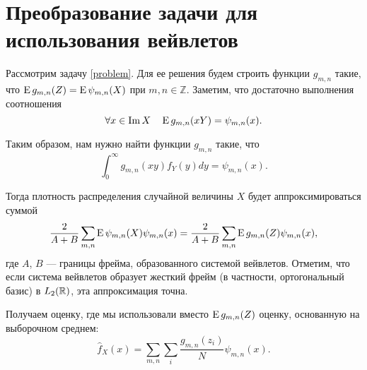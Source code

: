 \documentclass[../paper.tex]{subfiles}
\begin{document}
\section{Преобразование задачи для использования вейвлетов}
Рассмотрим задачу \ref{problem}. Для ее решения будем строить функции $g_{m,n}$ такие, что $\operatorname{E} g_{m,n}(Z) = \operatorname{E} \psi_{m,n}(X)$ при $m, n \in \mathbb{Z}$. Заметим, что достаточно выполнения соотношения
\[
    \forall x \in \operatorname{Im} X \quad \operatorname{E} g_{m,n} (xY) = \psi_{m,n}(x) 
.\]

Таким образом, нам нужно найти функции $g_{m,n}$ такие, что
\begin{equation}\label{eq:int-eq}
	\int_0^\infty g_{m,n}(xy) f_Y(y) dy = \psi_{m,n}(x)
.\end{equation}

Тогда плотность распределения случайной величины $X$ будет аппроксимироваться суммой
\begin{equation}\label{eq:reconstruction}
	\frac{2}{A+B} \sum_{m,n} \operatorname{E} \psi_{m,n}(X)\psi_{m,n}(x)
	= \frac{2}{A+B} \sum_{m,n} \operatorname{E} g_{m,n}(Z) \psi_{m,n}(x)
,\end{equation}
где $A$, $B$ --- границы фрейма, образованного системой вейвлетов.
Отметим, что если система вейвлетов образует жесткий фрейм (в частности, ортогональный базис) в $L_2(\mathbb{R})$, эта аппроксимация точна.

Получаем оценку, где мы использовали вместо $\operatorname{E} g_{m,n}(Z)$ оценку, основанную на выборочном среднем:
\begin{equation}\label{eq:estimation}
	\hat{f}_X(x) = \sum_{m,n} \sum_i \frac{g_{m,n}(z_i)}{N} \psi_{m,n}(x)
.\end{equation}
\end{document}
